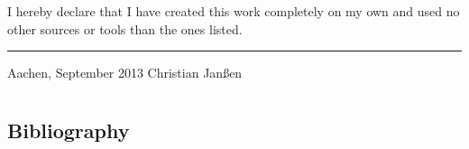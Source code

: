 \documentclass[final,twoside,11pt,titlepage,a4paper,english,bibliography=totocnumbered,listof=numbered]{scrbook}
\newcommand{\auth}{Christian Jan\ss en}
\begin{document}
I hereby declare that I have created this work completely on my own and used no other sources or tools than the ones listed.

\vspace{30 mm}

\begin{flushright}
	\rule{90mm}{1pt}

	Aachen, September 2013 \hspace{24 mm} \auth
\end{flushright}

%

%

\tableofcontents{}

\mainmatter

\part{}



\part{}


\part{}




\setwidesite{}

\begin{appendix} 

\addappheadtotoc

\chapter{Bibliography}
\label{cha:bibliography}
\printbibliography[heading=offline,filter=offline]
\printbibliography[heading=online,filter=online]






%

% 


\end{appendix}

\backmatter
\end{document}
